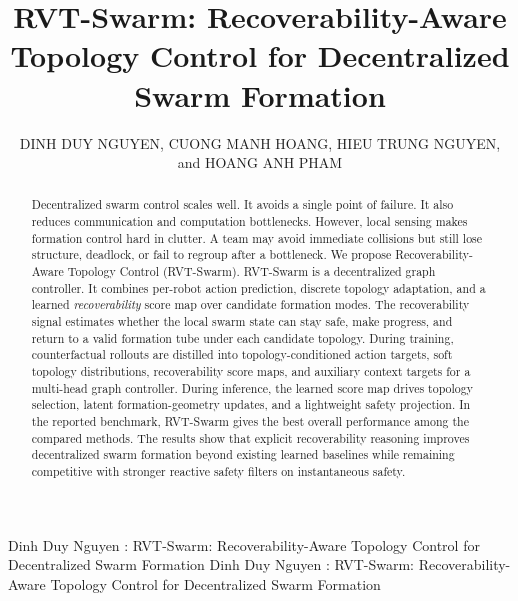 \documentclass{ieeeaccess}
\begin{document}

\title{RVT-Swarm: Recoverability-Aware Topology Control for Decentralized Swarm Formation}

\author{\uppercase{Dinh Duy Nguyen}, \uppercase{Cuong Manh Hoang}, \uppercase{Hieu Trung Nguyen}, and \uppercase{Hoang Anh Pham}}

\address[1]{Aerospace Electronics Laboratory - School of Electrical and Electronic Engineering, Hanoi University of Science and Technology, Hanoi, Vietnam.}
\address[2]{Faculty of Information Technology, Posts and Telecommunications Institute of Technology, Hanoi, Vietnam.}
\address[3]{AViS Lab., Faculty of Electronics Engineering 1, Posts and Telecommunications Institute of Technology, Hanoi, Vietnam}

\markboth
{Dinh Duy Nguyen \headeretal: RVT-Swarm: Recoverability-Aware Topology Control for Decentralized Swarm Formation}
{Dinh Duy Nguyen \headeretal: RVT-Swarm: Recoverability-Aware Topology Control for Decentralized Swarm Formation}


\titlepgskip=-15pt


\begin{abstract}
Decentralized swarm control scales well. It avoids a single point of
failure. It also reduces communication and computation bottlenecks.
However, local sensing makes formation control hard in clutter. A team
may avoid immediate collisions but still lose structure, deadlock, or
fail to regroup after a bottleneck. We propose Recoverability-Aware
Topology Control (RVT-Swarm). RVT-Swarm is a decentralized graph
controller. It combines per-robot action prediction, discrete topology
adaptation, and a learned \emph{recoverability} score map over candidate
formation modes. The recoverability signal estimates whether the local
swarm state can stay safe, make progress, and return to a valid
formation tube under each candidate topology. During training,
counterfactual rollouts are distilled into topology-conditioned action
targets, soft topology distributions, recoverability score maps, and
auxiliary context targets for a multi-head graph controller. During
inference, the learned score map drives topology selection, latent
formation-geometry updates, and a lightweight safety projection. In the
reported benchmark, RVT-Swarm gives the best overall performance among
the compared methods. The results show that explicit recoverability
reasoning improves decentralized swarm formation beyond existing learned
baselines while remaining competitive with stronger reactive safety
filters on instantaneous safety.
\end{abstract}
\end{document}
